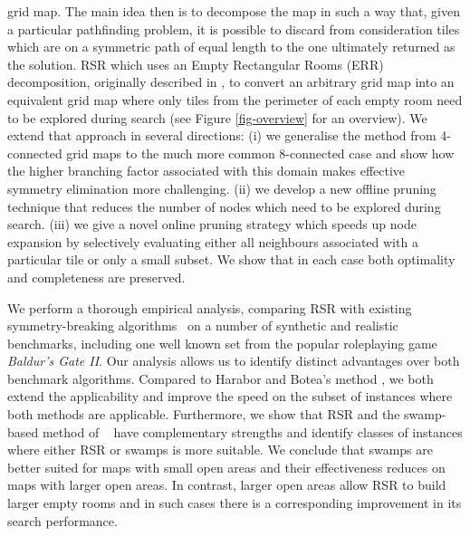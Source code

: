 grid map.
The main idea then is to decompose the map in such a way that, 
given a particular pathfinding problem, it is possible to discard from consideration tiles which are on 
a symmetric path of equal length to the one ultimately returned as the solution.
RSR which uses an Empty Rectangular Rooms (ERR) decomposition, originally described in
\cite{harabor10}, to convert an arbitrary grid map into an equivalent grid map where only tiles from the 
perimeter of each empty room need to be explored during search (see Figure
\ref{fig-overview} for an overview).
We extend that approach in several directions: (i) we generalise the method from 4-connected grid maps to 
the much more common 8-connected case and show how the higher branching factor associated 
with this domain makes effective symmetry elimination more challenging.
(ii) we develop a new offline pruning technique that reduces the number of nodes which
need to be explored during search.
(iii) we give a novel online pruning strategy which speeds up node expansion by selectively 
evaluating either all neighbours associated with a particular tile or only a small subset.
We show that in each case both optimality and completeness are preserved.
\par
We perform a thorough empirical analysis, comparing RSR with existing
symmetry-breaking algorithms~\cite{pochter10,harabor10}
on a number of synthetic and realistic benchmarks, including one well known set 
from the popular roleplaying game \emph{Baldur's Gate II}.
Our analysis allows us to identify distinct advantages over both benchmark algorithms.
Compared to Harabor and Botea's method , 
we both extend the applicability and improve the speed
on the subset of instances where both methods are applicable.
Furthermore, we show that RSR and the swamp-based method of 
\citeauthor{pochter10}~
have complementary strengths and identify classes of instances where
either RSR or swamps is more suitable.
We conclude that swamps are better suited for maps with
small open areas and their effectiveness reduces on maps with larger open areas.
In contrast, larger open areas allow RSR to build larger empty rooms and in such
cases there is a corresponding improvement in its search performance.





